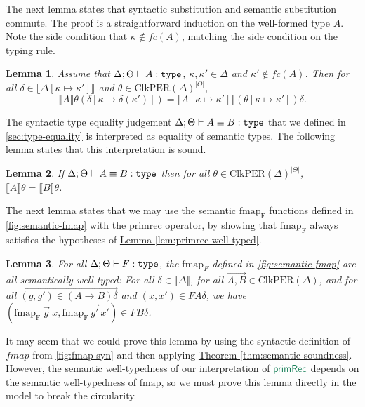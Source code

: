 \documentclass[natbib]{sigplanconf}
\newcommand{\elim}[1]{\textcolor{elim}{\textsf{#1}}}
\newcommand{\ident}[1]{\textit{#1}}
\newcommand{\sem}[1]{\llbracket #1 \rrbracket}
\newcommand{\sortType}{\texttt{\textup{type}}}
\newcommand{\ClkPER}{\mathrm{ClkPER}}
\newtheorem{lemma}{Lemma}
\newcommand{\lemref}[1]{\hyperref[#1]{Lemma \ref*{#1}}}
\newcommand{\thmref}[1]{\hyperref[#1]{Theorem \ref*{#1}}}
\begin{document}
The next lemma states that syntactic substitution and semantic
substitution commute. The proof is a straightforward induction on the
well-formed type $A$. Note the side condition that $\kappa \not\in
\mathit{fc}(A)$, matching the side condition on the
 typing rule.

\begin{lemma}\label{lem:substitution-lemma}
  Assume that $\Delta; \Theta \vdash A : \sortType$, $\kappa, \kappa'
  \in \Delta$ and $\kappa' \not\in \mathit{fc}(A)$. Then for all
  $\delta \in \sem{\Delta[\kappa\mapsto\kappa']}$ and $\theta \in
  \ClkPER(\Delta)^{|\Theta|}$,
  \begin{displaymath}
    \sem{A}\theta (\delta[\kappa \mapsto \delta(\kappa')]) = \sem{A[\kappa\mapsto\kappa']}(\theta[\kappa\mapsto\kappa'])\delta.
  \end{displaymath}
\end{lemma}

The syntactic type equality judgement $\Delta; \Theta \vdash A \equiv
B : \sortType$ that we defined in \autoref{sec:type-equality} is
interpreted as equality of semantic types. The following lemma states
that this interpretation is sound.

\begin{lemma}\label{lem:type-equality}
  If $\Delta; \Theta \vdash A \equiv B : \sortType$ then for all
  $\theta \in \ClkPER(\Delta)^{|\Theta|}$, $\sem{A}\theta =
  \sem{B}\theta$.
\end{lemma}

The next lemma states that we may use the semantic $\mathrm{fmap_F}$
functions defined in \autoref{fig:semantic-fmap} with the
$\mathrm{primrec}$ operator, by showing that $\mathrm{fmap_F}$ always
satisfies the hypotheses of \lemref{lem:primrec-well-typed}.

\begin{lemma}\label{lem:sem-fmap-well-typed}
  For all $\Delta; \Theta \vdash F : \sortType$, the $\mathrm{fmap}_F$
  defined in \autoref{fig:semantic-fmap} are all semantically
  well-typed: For all $\delta \in \sem{\Delta}$, for all $\overrightarrow{A,B}
  \in \ClkPER(\Delta)$, and for all $\overrightarrow{(g,g') \in (A \to B)\delta}$
  and $(x,x') \in FA\delta$, we have $(\mathrm{fmap_F}\ \overrightarrow{g}\ x,
  \mathrm{fmap_F}\ \overrightarrow{g'}\ x') \in FB\delta$.
\end{lemma}

It may seem that we could prove this lemma by using the syntactic
definition of $\ident{fmap}$ from \autoref{fig:fmap-syn} and then
applying \thmref{thm:semantic-soundness}. However, the semantic
well-typedness of our interpretation of $\elim{primRec}$ depends on
the semantic well-typedness of $\mathrm{fmap}$, so we must prove this
lemma directly in the model to break the circularity.
\end{document}
